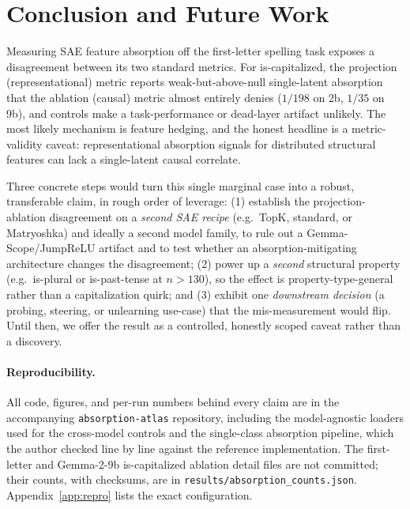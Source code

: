 \documentclass[11pt]{article}
\newcommand{\iscap}{\textsf{is-capitalized}}
\newcommand{\code}[1]{\texttt{#1}}
\theoremstyle{definition}
\begin{document}
\section{Conclusion and Future Work}\label{sec:concl}
Measuring SAE feature absorption off the first-letter spelling task exposes a disagreement between its two
standard metrics. For \iscap{}, the projection (representational) metric reports weak-but-above-null
single-latent absorption that the ablation (causal) metric almost entirely denies ($1/198$ on 2b, $1/35$ on
9b), and controls make a task-performance or dead-layer artifact unlikely. The most likely mechanism is feature hedging, and the honest
headline is a metric-validity caveat: representational absorption signals for distributed structural
features can lack a single-latent causal correlate.

Three concrete steps would turn this single marginal case into a robust, transferable claim, in rough order
of leverage: (1) establish the projection-ablation disagreement on a \emph{second SAE recipe} (e.g.\ TopK,
standard, or Matryoshka) and ideally a second model family, to rule out a Gemma-Scope/JumpReLU artifact and
to test whether an absorption-mitigating architecture changes the disagreement; (2) power up a \emph{second}
structural property (e.g.\ is-plural or is-past-tense at $n>130$), so the effect is property-type-general
rather than a capitalization quirk; and (3) exhibit one \emph{downstream decision} (a probing, steering, or
unlearning use-case) that the mis-measurement would flip. Until then, we offer the result as a controlled,
honestly scoped caveat rather than a discovery.

\paragraph{Reproducibility.}
All code, figures, and per-run numbers behind every claim are in the accompanying \code{absorption-atlas}
repository, including the model-agnostic loaders used for the cross-model controls and the single-class absorption
pipeline, which the author checked line by line against the reference implementation. The first-letter and Gemma-2-9b \iscap{} ablation detail
files are not committed; their counts, with checksums, are in \code{results/absorption\_counts.json}.
Appendix~\ref{app:repro} lists the exact configuration.

\appendix
\end{document}
